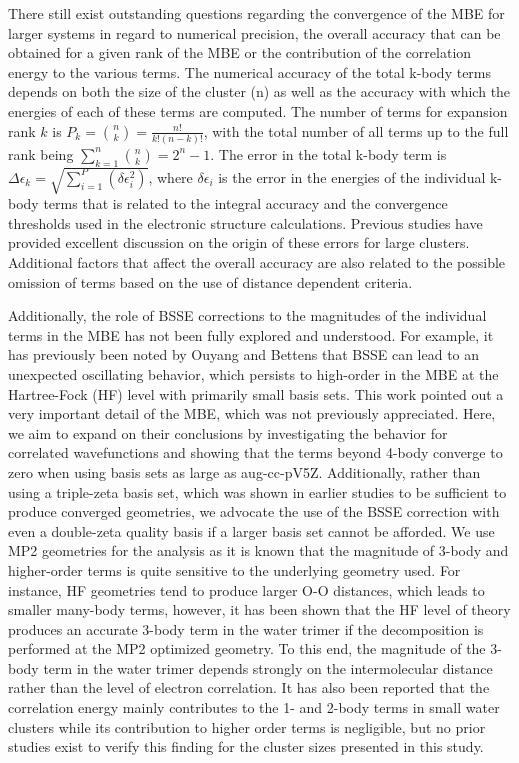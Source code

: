 \documentclass[11pt, proquest]{uwthesis}[2020/02/24]
\begin{document}
\par There still exist outstanding questions regarding the convergence of the MBE for larger systems in regard to numerical precision, the overall accuracy that can be obtained for a given rank of the MBE\autocite{lao_understanding_2016, richard_understanding_2014} or the contribution of the correlation energy to the various terms. The numerical accuracy of the total k-body terms depends on both the size of the cluster (n) as well as the accuracy with which the energies of each of these terms are computed. The number of terms for expansion rank $k$ is $P_k=\binom{n}{k}=\frac{n!}{k!(n-k)!}$, with the total number of all terms up to the full rank being $\sum_{k=1}^{n}\binom{n}{k}=2^n-1$. The error in the total k-body term is $\Delta\epsilon_k=\sqrt{\sum_{i=1}^P(\delta\epsilon_i^2)}$, where $\delta\epsilon_i$ is the error in the energies of the individual k-body terms that is related to the integral accuracy and the convergence thresholds used in the electronic structure calculations. Previous studies have provided excellent discussion\autocite{lao_understanding_2016, richard_understanding_2014} on the origin of these errors for large clusters.  Additional factors that affect the overall accuracy are also related to the possible omission of terms based on the use of distance dependent criteria.
\par Additionally, the role of BSSE corrections to the magnitudes of the individual terms in the MBE has not been fully explored and understood. For example, it has previously been noted by Ouyang and Bettens that BSSE can lead to an unexpected oscillating behavior, which persists to high-order in the MBE at the Hartree-Fock (HF) level with primarily small basis sets.\autocite{ouyang_trouble_2014} This work pointed out a very important detail of the MBE, which was not previously appreciated. Here, we aim to expand on their conclusions by investigating the behavior for correlated wavefunctions and showing that the terms beyond 4-body converge to zero when using basis sets as large as aug-cc-pV5Z. Additionally, rather than using a triple-zeta basis set, which was shown in earlier studies to be sufficient to produce converged geometries,\autocite{xantheas_ab_1994, miliordos_optimal_2013} we advocate the use of the BSSE correction with even a double-zeta quality basis if a larger basis set cannot be afforded. We use MP2 geometries for the analysis as it is known that the magnitude of 3-body and higher-order terms is quite sensitive to the underlying geometry used. For instance, HF geometries tend to produce larger O-O distances,\autocite{miliordos_optimal_2013} which leads to smaller many-body terms, however, it has been shown that the HF level of theory produces an accurate 3-body term in the water trimer if the decomposition is performed at the MP2 optimized geometry.\autocite{klopper_ab_1995} To this end, the magnitude of the 3-body term in the water trimer depends strongly on the intermolecular distance rather than the level of electron correlation. It has also been reported that the correlation energy mainly contributes to the 1- and 2-body terms in small water clusters while its contribution to higher order terms is negligible,\autocite{dahlke_electrostatically_2007} but no prior studies exist to verify this finding for the cluster sizes presented in this study.
\end{document}
